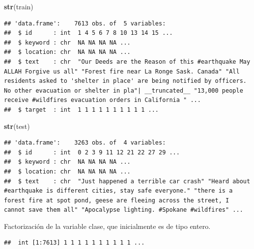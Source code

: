 \documentclass[
]{article}
\newenvironment{Shaded}{\begin{snugshade}}{\end{snugshade}}
\newcommand{\KeywordTok}[1]{\textcolor[rgb]{0.13,0.29,0.53}{\textbf{#1}}}
\newcommand{\NormalTok}[1]{#1}
\newcommand{\OperatorTok}[1]{\textcolor[rgb]{0.81,0.36,0.00}{\textbf{#1}}}
\newcommand{\StringTok}[1]{\textcolor[rgb]{0.31,0.60,0.02}{#1}}
\begin{document}
\begin{Shaded}
\begin{Highlighting}[]
\KeywordTok{str}\NormalTok{(train)}
\end{Highlighting}
\end{Shaded}

\begin{verbatim}
## 'data.frame':    7613 obs. of  5 variables:
##  $ id      : int  1 4 5 6 7 8 10 13 14 15 ...
##  $ keyword : chr  NA NA NA NA ...
##  $ location: chr  NA NA NA NA ...
##  $ text    : chr  "Our Deeds are the Reason of this #earthquake May ALLAH Forgive us all" "Forest fire near La Ronge Sask. Canada" "All residents asked to 'shelter in place' are being notified by officers. No other evacuation or shelter in pla"| __truncated__ "13,000 people receive #wildfires evacuation orders in California " ...
##  $ target  : int  1 1 1 1 1 1 1 1 1 1 ...
\end{verbatim}

\begin{Shaded}
\begin{Highlighting}[]
\KeywordTok{str}\NormalTok{(test)}
\end{Highlighting}
\end{Shaded}

\begin{verbatim}
## 'data.frame':    3263 obs. of  4 variables:
##  $ id      : int  0 2 3 9 11 12 21 22 27 29 ...
##  $ keyword : chr  NA NA NA NA ...
##  $ location: chr  NA NA NA NA ...
##  $ text    : chr  "Just happened a terrible car crash" "Heard about #earthquake is different cities, stay safe everyone." "there is a forest fire at spot pond, geese are fleeing across the street, I cannot save them all" "Apocalypse lighting. #Spokane #wildfires" ...
\end{verbatim}

Factorización de la variable clase, que inicialmente es de tipo entero.

\begin{Shaded}
\end{Shaded}

\begin{verbatim}
##  int [1:7613] 1 1 1 1 1 1 1 1 1 1 ...
\end{verbatim}

\begin{Shaded}
\end{Shaded}
\end{document}
